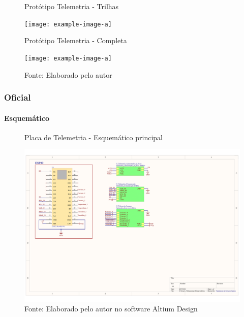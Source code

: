 \documentclass[../delivery_hospital_report.tex]{subfiles}
\begin{document}
\begin{figure}[!ht]
    \centering
    \begin{minipage}{0.5\textwidth}
        \centering
        \caption{Protótipo Telemetria - Trilhas}
        \texttt{[image: example-image-a]} 
        \label{fig:figura1minipg}
    \end{minipage}\hfill
    \begin{minipage}{0.5\textwidth}
        \centering
        \caption{Protótipo Telemetria - Completa }
        \texttt{[image: example-image-a]} 
        \label{fig:figura1minipg}
    \end{minipage}\hfill
    
    \caption*{Fonte: Elaborado pelo autor }
    \label{fig:figurasminipg}
\end{figure}

\subsubsection{Oficial}

\paragraph{Esquemático}

\begin{figure}[h]
\centering
    \caption{Placa de Telemetria - Esquemático principal }
    \centering %
    \includegraphics[width=17cm]{modulos/Telemetria_Oficial-1.png}
    \caption*{Fonte: Elaborado pelo autor no software Altium Design\cite{altium21} }
    \label{Protótipo placa de ## - Esquemático principal}
\end{figure}
\end{document}
